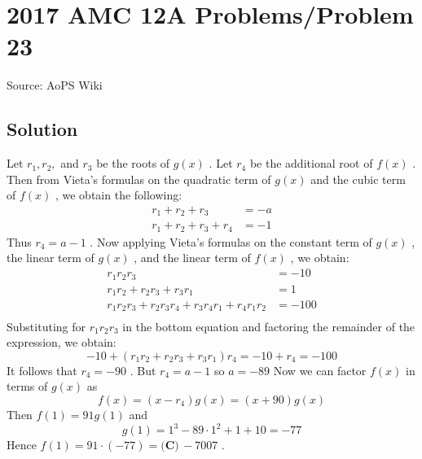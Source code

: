 \documentclass[12pt]{article}
\begin{document}
\section*{{2017 AMC 12A Problems/Problem 23}}
Source: AoPS Wiki

\subsection*{Solution}
Let $r_1,r_2,$ and $r_3$ be the roots of $g(x)$ . Let $r_4$ be the additional root of $f(x)$ . Then from Vieta's formulas on the quadratic term of $g(x)$ and the cubic term of $f(x)$ , we obtain the following: \begin{align*} r_1+r_2+r_3&=-a \\ r_1+r_2+r_3+r_4&=-1 \end{align*} Thus $r_4=a-1$ . Now applying Vieta's formulas on the constant term of $g(x)$ , the linear term of $g(x)$ , and the linear term of $f(x)$ , we obtain: \begin{align*} r_1r_2r_3 & = -10\\ r_1r_2+r_2r_3+r_3r_1 &= 1\\ r_1r_2r_3+r_2r_3r_4+r_3r_4r_1+r_4r_1r_2 & = -100\\ \end{align*} Substituting for $r_1r_2r_3$ in the bottom equation and factoring the remainder of the expression, we obtain: \[-10+(r_1r_2+r_2r_3+r_3r_1)r_4=-10+r_4=-100\] It follows that $r_4=-90$ . But $r_4=a-1$ so $a=-89$ Now we can factor $f(x)$ in terms of $g(x)$ as \[f(x)=(x-r_4)g(x)=(x+90)g(x)\] Then $f(1)=91g(1)$ and \[g(1)=1^3-89\cdot 1^2+1+10=-77\] Hence $f(1)=91\cdot(-77)=\boxed{\textbf{(C)}\,-7007}$ .
\end{document}
